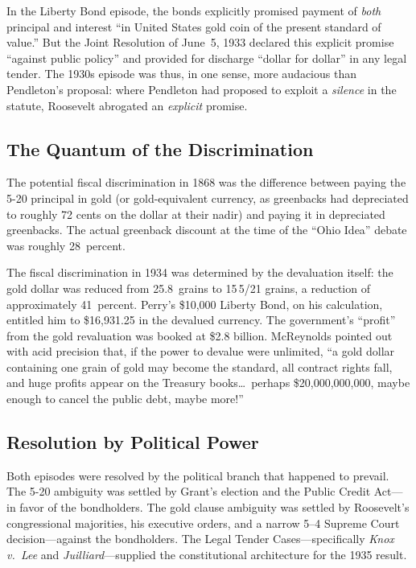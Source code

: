 \documentclass[12pt]{article}
\begin{document}
In the Liberty Bond episode, the bonds explicitly promised payment of
\textit{both} principal and interest ``in United States gold coin of the
present standard of value.'' But the Joint Resolution of June~5, 1933
declared this explicit promise ``against public policy'' and provided
for discharge ``dollar for dollar'' in any legal tender. The 1930s
episode was thus, in one sense, more audacious than Pendleton's
proposal: where Pendleton had proposed to exploit a \textit{silence} in
the statute, Roosevelt abrogated an \textit{explicit} promise.

\subsection{The Quantum of the Discrimination}

The potential fiscal discrimination in 1868 was the difference between
paying the 5-20 principal in gold (or gold-equivalent currency, as
greenbacks had depreciated to roughly 72 cents on the dollar at their
nadir) and paying it in depreciated greenbacks. The actual greenback
discount at the time of the ``Ohio Idea'' debate was roughly 28~percent.

The fiscal discrimination in 1934 was determined by the devaluation
itself: the gold dollar was reduced from 25.8~grains to 15\,5/21
grains, a reduction of approximately 41~percent. Perry's \$10,000
Liberty Bond, on his calculation, entitled him to \$16,931.25 in the
devalued currency. The government's ``profit'' from the gold
revaluation was booked at \$2.8 billion. McReynolds pointed out with
acid precision that, if the power to devalue were unlimited, ``a gold
dollar containing one grain of gold may become the standard, all
contract rights fall, and huge profits appear on the Treasury
books\ldots\ perhaps \$20,000,000,000, maybe enough to cancel the
public debt, maybe more!''

\subsection{Resolution by Political Power}

Both episodes were resolved by the political branch that happened to
prevail. The 5-20 ambiguity was settled by Grant's election and the
Public Credit Act---in favor of the bondholders. The gold clause
ambiguity was settled by Roosevelt's congressional majorities, his
executive orders, and a narrow 5--4 Supreme Court decision---against
the bondholders. The Legal Tender Cases---specifically \textit{Knox v.\
Lee} and \textit{Juilliard}---supplied the constitutional architecture
for the 1935 result.
\end{document}
